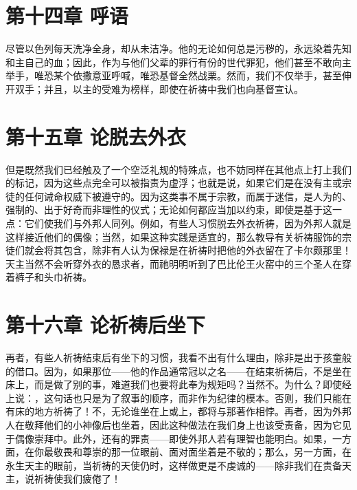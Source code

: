 
\section{第十四章 呼语}

尽管以色列每天洗净全身，却从未洁净。他的无论如何总是污秽的，永远染着先知和主自己的血；因此，作为与他们父辈的罪行有份的世代罪犯，他们甚至不敢向主举手，唯恐某个依撒意亚呼喊，唯恐基督全然战栗。然而，我们不仅举手，甚至伸开双手；并且，以主的受难为榜样，即使在祈祷中我们也向基督宣认。\par


\section{第十五章 论脱去外衣}

但是既然我们已经触及了一个空泛礼规的特殊点，也不妨同样在其他点上打上我们的标记，因为这些点完全可以被指责为虚浮；也就是说，如果它们是在没有主或宗徒的任何诫命权威下被遵守的。因为这类事不属于宗教，而属于迷信，是人为的、强制的、出于好奇而非理性的仪式；无论如何都应当加以约束，即使是基于这一点：它们使我们与外邦人同列。例如，有些人习惯脱去外衣祈祷，因为外邦人就是这样接近他们的偶像；当然，如果这种实践是适宜的，那么教导有关祈祷服饰的宗徒们就会将其包含，除非有人认为保禄是在祈祷时把他的外衣留在了卡尔颇那里！ 天主当然不会听穿外衣的恳求者，而祂明明听到了巴比伦王火窑中的三个圣人在穿着裤子和头巾祈祷。\par


\section{第十六章 论祈祷后坐下}

再者，有些人祈祷结束后有坐下的习惯，我看不出有什么理由，除非是出于孩童般的借口。因为，如果那位——他的作品通常冠以之名——在结束祈祷后，不是坐在床上，而是做了别的事，难道我们也要将此奉为规矩吗？当然不。为什么？即使经上说：，这句话也只是为了叙事的顺序，而非作为纪律的模本。否则，我们只能在有床的地方祈祷了！不，无论谁坐在上或上，都将与那著作相悖。再者，因为外邦人在敬拜他们的小神像后也坐着，因此这种做法在我们身上也该受责备，因为它见于偶像崇拜中。此外，还有的罪责——即使外邦人若有理智也能明白。如果，一方面，在你最敬畏和尊崇的那一位眼前、面对面坐着是不敬的；那么，另一方面，在永生天主的眼前，当祈祷的天使仍时，这样做更是不虔诚的——除非我们在责备天主，说祈祷使我们疲倦了！\par

